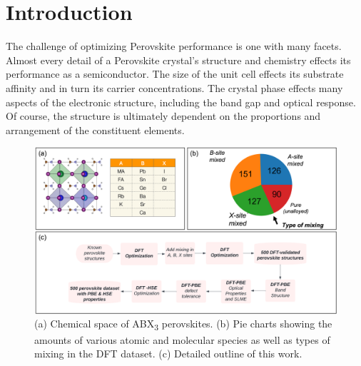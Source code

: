 \documentclass[twoside, twocolumn, 9pt, draft]{article}
\begin{document}
\renewcommand*\rmdefault{bch}\normalfont\upshape
\rmfamily
\section*{}
\vspace{-1cm}



\section*{Introduction}
\label{sec:orga31ca3b}
The challenge of optimizing Perovskite performance is one with many
facets. Almost every detail of a Perovskite crystal's structure and
chemistry effects its performance as a semiconductor. The size of the
unit cell effects its substrate affinity and in turn its carrier
concentrations. The crystal phase effects many aspects of the
electronic structure, including the band gap and optical response. Of
course, the structure is ultimately dependent on the proportions and
arrangement of the constituent elements.

\begin{figure}
\centering
\includegraphics[h,width=.9\linewidth]{Figure1.png}
\caption{\label{Fig:outline} (a) Chemical space of ABX\textsubscript{3} perovskites. (b) Pie charts showing the amounts of various atomic and molecular species as well as types of mixing in the DFT dataset. (c) Detailed outline of this work.}
\end{figure}
\end{document}
